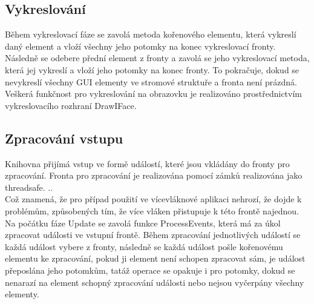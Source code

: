 \documentclass[report,11pt]{elsarticle}
\begin{document}
\subsection{Vykreslování}
Během vykreslovací fáze se zavolá metoda kořenového elementu, která vykreslí daný element a vloží všechny jeho potomky na konec vykreslovací fronty. Následně se odebere přední element z fronty a zavolá se jeho vykreslovací metoda, která jej vykreslí a vloží jeho potomky na konec fronty. To pokračuje, dokud se nevykreslí všechny GUI elementy ve stromové struktuře a fronta není prázdná.\\
Veškerá funkčnost pro vykreslování na obrazovku je realizováno prostřednictvím vykreslovacího rozhraní DrawIFace.\\


\subsection{Zpracování vstupu}
Knihovna přijímá vstup ve formě událostí, které jsou vkládány do fronty pro zpracování. Fronta pro zpracování je realizována pomocí zámků realizována jako threadsafe. .. \\
Což znamená, že pro případ použití ve vícevláknové aplikaci nehrozí, že dojde k problémům, způsobených tím, že více vláken přistupuje k této frontě najednou.
Na počátku fáze Update se zavolá funkce ProcessEvents, která má za úkol zpracovat události ve vstupní frontě. Během zpracování jednotlivých událostí se každá událost vybere z fronty, následně se každá událost pošle kořenovému elementu ke zpracování, pokud ji element není schopen zpracovat sám, je událost přeposlána jeho potomkům, tatáž operace se opakuje i pro potomky, dokud se nenarazí na element schopný zpracování události nebo nejsou vyčerpány všechny elementy.\\
\end{document}
